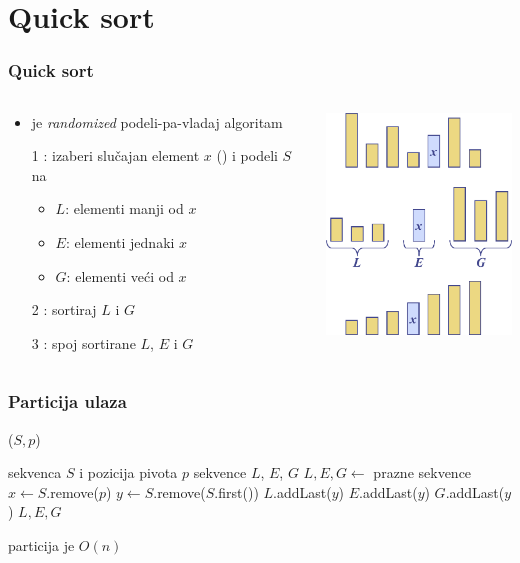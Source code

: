 \documentclass[compress]{beamer}
\begin{document}
\section[Quick sort]{Quick sort}

\begin{frame}[fragile]
  \frametitle{Quick sort}
  \begin{columns}
    \begin{column}[t]{6cm}
      \begin{itemize}
        \item {} je \textit{randomized} podeli-pa-vladaj algoritam
        \item[1] : izaberi slučajan element $x$ () i podeli $S$ na
        \begin{itemize}
          \item $L$: elementi manji od $x$
          \item $E$: elementi jednaki $x$
          \item $G$: elementi veći od $x$
        \end{itemize}    
        \item[2] : sortiraj $L$ i $G$
        \item[3] : spoj sortirane $L$, $E$ i $G$
      \end{itemize}    
    \end{column}
    \begin{column}[t]{6cm}
      \begin{center}
        \includegraphics[width=5cm]{asp-12-pic14.png}
      \end{center}
    \end{column}
  \end{columns}
\end{frame}

\begin{frame}
  \frametitle{Particija ulaza}
  ($S, p$)
  \begin{algorithmic}
    \REQUIRE sekvenca $S$ i pozicija pivota $p$
    \ENSURE sekvence $L$, $E$, $G$
    \STATE $L,E,G \leftarrow$ prazne sekvence
    \STATE $x \leftarrow S$.remove($p$) 
      \STATE $y \leftarrow S$.remove($S$.first())
        \STATE $L$.addLast($y$)
        \STATE $E$.addLast($y$)
      \ELSE 
        \STATE $G$.addLast($y$)
      \ENDIF
    \ENDWHILE
    \RETURN $L,E,G$
  \end{algorithmic}
  \hfill particija je $O(n)$    
\end{frame}
\end{document}
